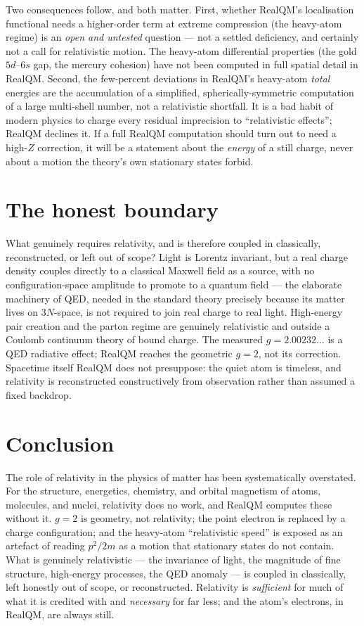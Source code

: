 \documentclass[11pt]{article}
\begin{document}
Two consequences follow, and both matter. First, whether RealQM's localisation functional needs a higher-order
term at extreme compression (the heavy-atom regime) is an \emph{open and untested} question --- not a settled
deficiency, and certainly not a call for relativistic motion. The heavy-atom differential properties (the gold
$5d$--$6s$ gap, the mercury cohesion) have not been computed in full spatial detail in RealQM. Second, the
few-percent deviations in RealQM's heavy-atom \emph{total} energies are the accumulation of a simplified,
spherically-symmetric computation of a large multi-shell number, not a relativistic shortfall. It is a bad habit
of modern physics to charge every residual imprecision to ``relativistic effects''; RealQM declines it. If a
full RealQM computation should turn out to need a high-$Z$ correction, it will be a statement about the
\emph{energy} of a still charge, never about a motion the theory's own stationary states forbid.

\section{The honest boundary}

What genuinely requires relativity, and is therefore coupled in classically, reconstructed, or left out of
scope? Light is Lorentz invariant, but a real charge density couples directly to a classical Maxwell field as a
source, with no configuration-space amplitude to promote to a quantum field --- the elaborate machinery of QED,
needed in the standard theory precisely because its matter lives on $3N$-space, is not required to join real
charge to real light. High-energy pair creation and the parton regime are genuinely relativistic and outside a
Coulomb continuum theory of bound charge. The measured $g=2.00232\ldots$ is a QED radiative effect; RealQM
reaches the geometric $g=2$, not its correction. Spacetime itself RealQM does not presuppose: the quiet atom is
timeless, and relativity is reconstructed constructively from observation rather than assumed a fixed backdrop.

\section{Conclusion}

The role of relativity in the physics of matter has been systematically overstated. For the structure,
energetics, chemistry, and orbital magnetism of atoms, molecules, and nuclei, relativity does no work, and RealQM
computes these without it. $g=2$ is geometry, not relativity; the point electron is replaced by a charge
configuration; and the heavy-atom ``relativistic speed'' is exposed as an artefact of reading $p^2/2m$ as a
motion that stationary states do not contain. What is genuinely relativistic --- the invariance of light, the
magnitude of fine structure, high-energy processes, the QED anomaly --- is coupled in classically, left honestly
out of scope, or reconstructed. Relativity is \emph{sufficient} for much of what it is credited with and
\emph{necessary} for far less; and the atom's electrons, in RealQM, are always still.
\end{document}
